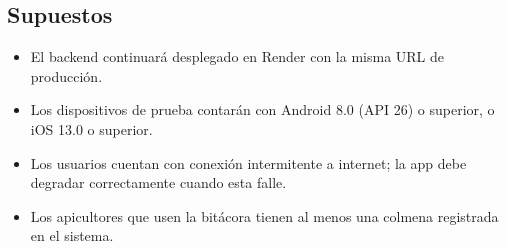 \subsection{Supuestos}

\begin{itemize}[leftmargin=*]
  \item El backend continuará desplegado en Render con la misma URL de producción.
  \item Los dispositivos de prueba contarán con Android 8.0 (API 26) o superior, o iOS 13.0 o superior.
  \item Los usuarios cuentan con conexión intermitente a internet; la app debe degradar correctamente cuando esta falle.
  \item Los apicultores que usen la bitácora tienen al menos una colmena registrada en el sistema.
\end{itemize}

